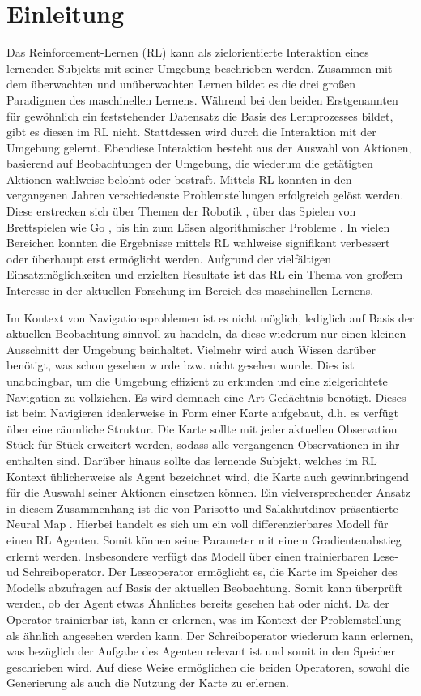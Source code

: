 \chapter{Einleitung}

Das Reinforcement-Lernen (RL) kann als zielorientierte Interaktion eines lernenden Subjekts mit seiner Umgebung beschrieben werden. Zusammen mit dem überwachten und unüberwachten Lernen bildet es die drei großen Paradigmen des maschinellen Lernens. Während bei den beiden Erstgenannten für gewöhnlich ein feststehender Datensatz die Basis des Lernprozesses bildet, gibt es diesen im RL nicht. Stattdessen wird durch die Interaktion mit der Umgebung gelernt. Ebendiese Interaktion besteht aus der Auswahl von Aktionen, basierend auf Beobachtungen der Umgebung, die wiederum die getätigten Aktionen wahlweise belohnt oder bestraft. Mittels RL konnten in den vergangenen Jahren verschiedenste Problemstellungen erfolgreich gelöst werden. Diese erstrecken sich über Themen der Robotik \cite{MappingPlanning}, über das Spielen von Brettspielen wie Go \cite{Go}, bis hin zum Lösen algorithmischer Probleme \cite{DNC}. In vielen Bereichen konnten die Ergebnisse mittels RL wahlweise signifikant verbessert oder überhaupt erst ermöglicht werden. Aufgrund der vielfältigen Einsatzmöglichkeiten und erzielten Resultate ist das RL ein Thema von großem Interesse in der aktuellen Forschung im Bereich des maschinellen Lernens.

Im Kontext von Navigationsproblemen ist es nicht möglich, lediglich auf Basis der aktuellen Beobachtung sinnvoll zu handeln, da diese wiederum nur einen kleinen Ausschnitt der Umgebung beinhaltet. Vielmehr wird auch Wissen darüber benötigt, was schon gesehen wurde bzw. nicht gesehen wurde. Dies ist unabdingbar, um die Umgebung effizient zu erkunden und eine zielgerichtete Navigation zu vollziehen. Es wird demnach eine Art Gedächtnis benötigt. Dieses ist beim Navigieren idealerweise in Form einer Karte aufgebaut, d.h. es verfügt über eine räumliche Struktur. Die Karte sollte mit jeder aktuellen Observation Stück für Stück erweitert werden, sodass alle vergangenen Observationen in ihr enthalten sind. Darüber hinaus sollte das lernende Subjekt, welches im RL Kontext üblicherweise als Agent bezeichnet wird, die Karte auch gewinnbringend für die Auswahl seiner Aktionen einsetzen können. Ein vielversprechender Ansatz in diesem Zusammenhang ist die von Parisotto und Salakhutdinov präsentierte Neural Map \cite{NeuralMap}. Hierbei handelt es sich um ein voll differenzierbares Modell für einen RL Agenten. Somit können seine Parameter mit einem Gradientenabstieg erlernt werden. Insbesondere verfügt das Modell über einen trainierbaren Lese- ud Schreiboperator. Der Leseoperator ermöglicht es, die Karte im Speicher des Modells abzufragen auf Basis der aktuellen Beobachtung. Somit kann überprüft werden, ob der Agent etwas Ähnliches bereits gesehen hat oder nicht. Da der Operator trainierbar ist, kann er erlernen, was im Kontext der Problemstellung als ähnlich angesehen werden kann. Der Schreiboperator wiederum kann erlernen, was bezüglich der Aufgabe des Agenten relevant ist und somit in den Speicher geschrieben wird. Auf diese Weise ermöglichen die beiden Operatoren, sowohl die Generierung als auch die Nutzung der Karte zu erlernen.


